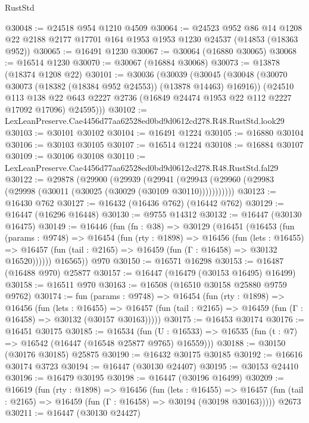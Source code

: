 \begin{lexlean}{RustStd}
\begin{coremodule}
@30048 := @24518 @954 @1210 @4509
@30064 := @24523
    @952
    @86
    @14
    @1208
    @22
    @2188
    @2177
    @17701
    @164
    @1953
    @1953
    @1230
    @24537
    (@14853 (@18363 @952))
@30065 := @16491 @1230
@30067 := @30064 (@16880 @30065)
@30068 := @16514 @1230
@30070 := @30067 (@16884 @30068)
@30073 := @13878 (@18374 @1208 @22)
@30101 := @30036
    (@30039
      (@30045
        (@30048 (@30070 @30073 (@18382 (@18384 @952 @24553)) (@13878 @14463) @16916))
        (@24510
          @113
          @138
          @22
          @643
          @2227
          @2736
          (@16849 @24474 @1953 @22 @112 @2227 @17092 @17096)
          @24595)))
@30102 := LexLeanPreserve.Cae4456d77aa62528ed0bd9d0612cd278.R48.RustStd.look29
@30103 := @30101 @30102
@30104 := @16491 @1224
@30105 := @16880 @30104
@30106 := @30103 @30105
@30107 := @16514 @1224
@30108 := @16884 @30107
@30109 := @30106 @30108
@30110 := LexLeanPreserve.Cae4456d77aa62528ed0bd9d0612cd278.R48.RustStd.fal29
@30122 := @29878
    (@29900
      (@29939
        (@29941 (@29943 (@29960 (@29983 (@29998 (@30011 (@30025 (@30029 (@30109 @30110)))))))))))
@30123 := @16430 @762
@30127 := @16432 (@16436 @762) (@16442 @762)
@30129 := @16447 (@16296 @16448)
@30130 := @9755 @14312
@30132 := @16447 (@30130 @16475)
@30149 := @16446
    (fun (fn : @38) =>
    @30129
      (@16451
        (@16453
          (fun (params : @9748) =>
          @16454
            (fun (rty : @1898) =>
            @16456
              (fun (lets : @16455) =>
              @16457 (fun (tail : @2165) => @16459 (fun (Γ : @16458) => @30132 @16520))))))
        @16565))
    @970
@30150 := @16571 @16298
@30153 := @16487 (@16488 @970) @25877
@30157 := @16447 (@16479 (@30153 @16495) @16499)
@30158 := @16511 @970
@30163 := @16508 (@16510 @30158 @25880 @9759 @9762)
@30174 := fun (params : @9748) =>
  @16454
    (fun (rty : @1898) =>
    @16456
      (fun (lets : @16455) =>
      @16457 (fun (tail : @2165) => @16459 (fun (Γ : @16458) => @30132 (@30157 @30163)))))
@30175 := @16453 @30174
@30176 := @16451 @30175
@30185 := @16534
    (fun (U : @16533) => @16535 (fun (t : @7) => @16542 (@16447 (@16548 @25877 @9765) @16559)))
@30188 := @30150 (@30176 @30185) @25875
@30190 := @16432 @30175 @30185
@30192 := @16616 @30174 @3723
@30194 := @16447 (@30130 @24407)
@30195 := @30153 @24410
@30196 := @16479 @30195
@30198 := @16447 (@30196 @16499)
@30209 := @16619
    (fun (rty : @1898) =>
    @16456
      (fun (lets : @16455) =>
      @16457 (fun (tail : @2165) => @16459 (fun (Γ : @16458) => @30194 (@30198 @30163)))))
    @2673
@30211 := @16447 (@30130 @24427)

\end{coremodule}
\end{lexlean}
